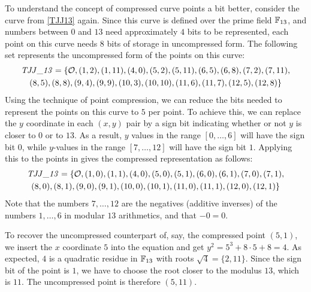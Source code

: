 \begin{example} To understand the concept of compressed curve points a bit better, consider the \TJJ{} curve from \examplename{} \ref{TJJ13} again. Since this curve is defined over the prime field $\mathbb{F}_{13}$, and numbers between $0$ and $13$ need approximately $4$ bits to be represented, each \TJJ{} point on this curve needs $8$ bits of storage in uncompressed form. The following set represents the uncompressed form of the points on this curve:
\begin{multline}
\mathit{TJJ\_13} = \{\mathcal{O}, (1, 2), (1, 11), (4, 0), (5, 2), (5, 11), (6, 5), (6, 8), (7,2), (7, 11), \\ (8, 5), (8, 8), (9, 4), (9, 9), (10, 3), (10,
10), (11, 6), (11, 7), (12, 5), (12, 8)\}
\end{multline}
Using the technique of point compression, we can reduce the bits needed to represent the points on this curve to  $5$ per point. To achieve this, we can replace the $y$ coordinate in each $(x,y)$ pair by a sign bit indicating whether or not $y$ is closer to $0$ or to $13$. As a result, $y$ values in the range $[0,\ldots,6]$ will have the sign bit $0$, while $y$-values in the range $[7,\ldots,12]$ will have the sign bit $1$. Applying this to the points in \TJJ{} gives the compressed representation as follows:
\begin{multline}
\mathit{TJJ\_13} = \{\mathcal{O}, (1, 0), (1, 1), (4, 0), (5, 0), (5, 1), (6, 0), (6, 1), (7,0), (7, 1), \\ (8, 0), (8, 1), (9, 0), (9, 1), (10, 0), (10,1), (11, 0), (11, 1), (12, 0), (12, 1)\}
\end{multline} 
Note that the numbers $7,\ldots, 12$ are the negatives (additive inverses) of the numbers $1,\ldots, 6$ in modular $13$ arithmetics, and that $-0=0$.

To recover the uncompressed counterpart of, say, the compressed point $(5,1)$, we insert the $x$ coordinate $5$ into the  equation and get $y^2 = 5^3 + 8\cdot 5 +8 = 4$. As expected, $4$ is a quadratic residue in $\mathbb{F}_{13}$ with roots $\sqrt{4}= \{2,11\}$. Since the sign bit of the point is $1$, we have to choose the root closer to the modulus $13$, which is $11$. The uncompressed point is therefore $(5,11)$. 
\end{example}
